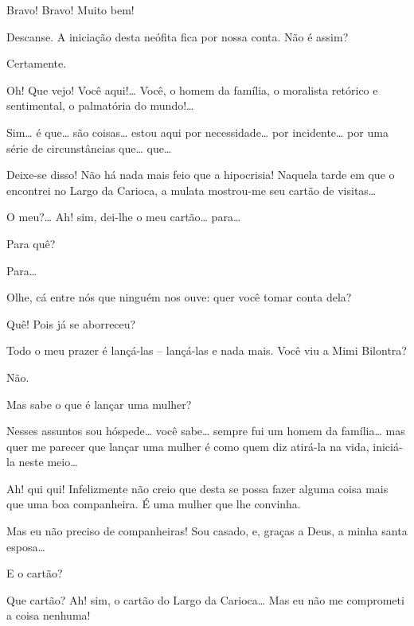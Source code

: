   Bravo! Bravo! Muito bem!

  Descanse. A iniciação desta neófita fica por
nossa conta.  Não é assim?

 Certamente. 

  Oh! Que vejo! Você
aqui!\ldots{} Você, o homem da família, o moralista retórico e sentimental, o
palmatória do mundo!\ldots{}

 Sim\ldots{} é que\ldots{} são coisas\ldots{} estou aqui por necessidade\ldots{} por
incidente\ldots{} por uma série de circunstâncias que\ldots{} que\ldots{}

 Deixe-se disso! Não há nada mais feio que a hipocrisia!
Naquela tarde em que o encontrei no Largo da Carioca, a mulata mostrou-me seu
cartão de visitas\ldots{}

 O meu?\ldots{} Ah! sim, dei-lhe o meu cartão\ldots{} para\ldots{}

 Para quê?

 Para\ldots{}

 Olhe, cá entre nós que ninguém nos ouve: quer você tomar conta
dela?

 Quê! Pois já se aborreceu?

 Todo o meu prazer é lançá-las -- lançá-las e nada mais. Você
viu a Mimi Bilontra?

 Não.

 Mas sabe o que é lançar uma mulher?

 Nesses assuntos sou hóspede\ldots{} você sabe\ldots{} sempre fui um homem
da família\ldots{} mas quer me parecer que lançar uma mulher é como quem diz
atirá-la na vida, iniciá-la neste meio\ldots{}

 Ah! qui qui! Infelizmente não creio que desta se possa fazer
alguma coisa mais que uma boa companheira. É uma mulher que lhe convinha.

 Mas eu não preciso de companheiras! Sou casado, e, graças a
Deus, a minha santa esposa\ldots{}

  E o cartão?

 Que cartão? Ah! sim, o cartão do Largo da Carioca\ldots{} Mas eu não
me comprometi a coisa nenhuma!

